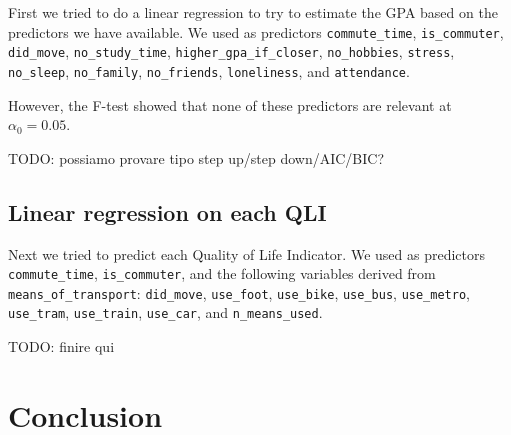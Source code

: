 \documentclass[12pt]{extarticle}
\numberwithin{table}{section}
\numberwithin{figure}{section}
\numberwithin{equation}{section}
\begin{document}
First we tried to do a linear regression to try to estimate the GPA based on the predictors we have available.
We used as predictors
\texttt{commute\_time},
\texttt{is\_commuter},
\texttt{did\_move},
\texttt{no\_study\_time},
\texttt{higher\_gpa\_if\_closer},
\texttt{no\_hobbies},
\texttt{stress},
\texttt{no\_sleep},
\texttt{no\_family},
\texttt{no\_friends},
\texttt{loneliness}, and
\texttt{attendance}.

However, the F-test showed that none of these predictors are relevant at $\alpha_0 = 0.05$.

TODO: possiamo provare tipo step up/step down/AIC/BIC?

\subsection{Linear regression on each QLI}

Next we tried to predict each Quality of Life Indicator.
We used as predictors
\texttt{commute\_time},
\texttt{is\_commuter}, and the following variables derived from \texttt{means\_of\_transport}:
\texttt{did\_move},
\texttt{use\_foot},
\texttt{use\_bike},
\texttt{use\_bus},
\texttt{use\_metro},
\texttt{use\_tram},
\texttt{use\_train},
\texttt{use\_car}, and
\texttt{n\_means\_used}.

TODO: finire qui

\section{Conclusion}
\end{document}
